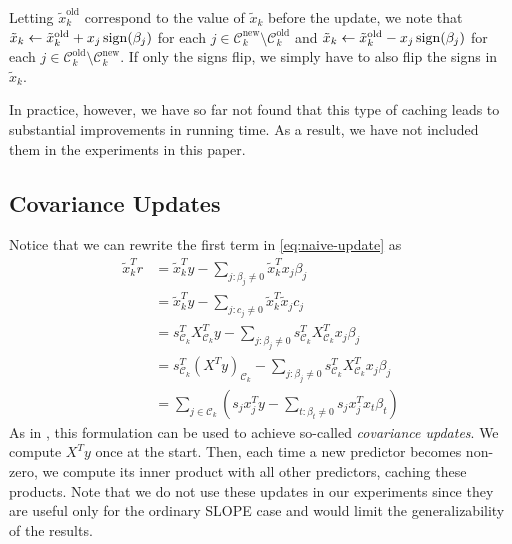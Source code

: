 Letting \(\tilde x_k^\text{old}\) correspond to the value of \(\tilde x_k\) before the update, we note that \(\tilde x_k \gets \tilde x_k^\text{old} + x_j \operatorname{sign}(\beta_j)\) for each \(j \in \mathcal{C}_k^\text{new} \setminus \mathcal{C}_k^\text{old}\) and \(\tilde x_k \gets \tilde x_k^\text{old} - x_j \operatorname{sign}(\beta_j)\) for each \(j \in \mathcal{C}_k^\text{old} \setminus \mathcal{C}_k^\text{new}\).
If only the signs flip, we simply have to also flip the signs in \(\tilde x_k\).

In practice, however, we have so far not found that this type of caching leads to substantial improvements in running time.
As a result, we have not included them in the experiments in this paper.

\subsection{Covariance Updates}

Notice that we can rewrite the first term in \eqref{eq:naive-update} as
\begin{equation}
  \begin{aligned}
    \tilde x_k^T r & = \tilde x_k^T y - \sum_{j : \beta_j \neq 0} \tilde x_k^T x_j \beta_j                                                                    \\
                   & = \tilde x_k^T y - \sum_{j : c_j \neq 0} \tilde x_k^T \tilde x_j c_j                                                                     \\
                   & = s_{\mathcal{C}_k}^T X_{\mathcal{C}_k}^T y - \sum_{j : \beta_j \neq 0} s_{\mathcal{C}_k}^T X_{\mathcal{C}_k}^T x_j \beta_j              \\
                   & = s_{\mathcal{C}_k}^T \left(X^T y\right)_{\mathcal{C}_k} - \sum_{j : \beta_j \neq 0} s_{\mathcal{C}_k}^T X_{\mathcal{C}_k}^T x_j \beta_j \\
                   & = \sum_{j \in \mathcal{C}_k}\left( s_j x_j^Ty - \sum_{t : \beta_t \neq 0} s_j x_j^T x_t \beta_t \right)
  \end{aligned}
\end{equation}
As in \textcite{friedman2010}, this formulation can be used to achieve so-called \emph{covariance updates}.
We compute \(X^T y\) once at the start.
Then, each time a new predictor becomes non-zero, we compute its inner product with all other predictors, caching these products.
Note that we do not use these updates in our experiments since they are useful only for the ordinary SLOPE case and would limit the generalizability of the results.



